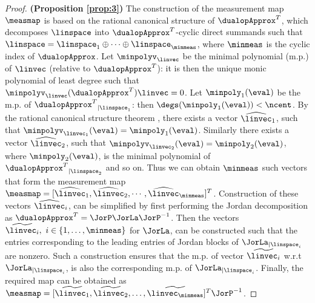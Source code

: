 \begin{proof}
\textbf{(Proposition \ref{prop:3})}
The construction of the measurement map $\measmap$ is based on the rational canonical structure of $\dualopApprox^T$, which decomposes $ \linspace $ into $\dualopApprox^T$-cyclic direct summands such that $\linspace = \linspace_1 \oplus \cdots \oplus \linspace_\minmeas$, where $\minmeas$ is the cyclic index of $\dualopApprox$. Let $\minpolyv_{\linvec}$ be the minimal polynomial (m.p.) of $ \linvec $ (relative to $\dualopApprox^T$): it is then the unique monic polynomial of least degree such that $\minpolyv_{\linvec}(\dualopApprox^T)\linvec=0$. Let $\minpoly_1(\eval)$ be the m.p. of ${\dualopApprox^T}_{|\linspace_1}$: then $\degs(\minpoly_1(\eval)) < \ncent$. By the rational canonical structure theorem \cite{wonham1974linear}, there exists a vector $\widehat{\linvec}_1$, such that $\minpolyv_{\linvec_1}(\eval)=\minpoly_1(\eval)$. Similarly there exists a vector $\widehat{\linvec}_2$, such that $\minpolyv_{\linvec_2}(\eval)=\minpoly_2(\eval)$, where $\minpoly_2(\eval)$, is the minimal polynomial of ${\dualopApprox^T}_{|\linspace_2}$ and so on. Thus we can obtain $\minmeas$ such vectors that form the measurement map $\measmap = [\widehat{\linvec}_1, \widehat{\linvec}_2,\cdots, \widehat{\linvec}_\minmeas]^T$. Construction of these vectors $\widehat{\linvec}_i$, can be simplified by first performing the Jordan decomposition as $ \dualopApprox^T = \JorP\JorLa\JorP^{-1} $. Then the vectors $ \widetilde{\linvec_i},\ i\in \{1,\dots,\minmeas\}$ for $ \JorLa $, can be constructed such that the entries corresponding to the leading entries of Jordan blocks of $ \JorLa_{|\linspace_i} $ are nonzero. Such a construction ensures that the m.p. of vector $ \widetilde{\linvec_i}$ w.r.t $\JorLa_{|\linspace_i}$, is also the corresponding m.p. of 
$\JorLa_{|\linspace_i}$. Finally, the required map can be obtained as $ \measmap = [\widetilde{\linvec_1}, \widetilde{\linvec_2},\dots,\widetilde{\linvec_\minmeas}]^T\JorP^{-1}$.
\end{proof}


